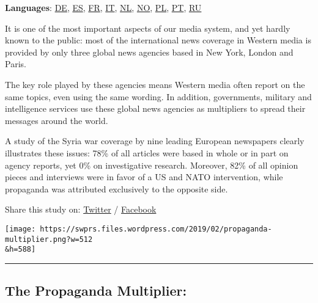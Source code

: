 \textbf{Languages}:
\href{https://swprs.org/der-propaganda-multiplikator/}{DE},
\href{https://www.bibliotecapleyades.net/sociopolitica2/sociopol_mediacontrol225.htm}{ES},
\href{https://swprs.org/le-multiplicateur-de-propagande/}{FR},
\href{https://www.bibliotecapleyades.net/sociopolitica2/sociopol_mediacontrol228.htm}{IT},
\href{https://swprs.files.wordpress.com/2019/12/propaganda-multiplier-dutch.pdf}{NL},
\href{https://midtifleisen.wordpress.com/2018/01/04/en-titt-pa-nyhetsbyraenes-rolle/}{NO},
\href{https://wolnemedia.net/powielacze-propagandy/}{PL},
\href{https://revistaopera.com.br/2019/04/23/a-propagacao-hegemonica-como-as-agencias-globais-e-a-midia-ocidental-cobrem-a-geopolitica-parte-1/}{PT},
\href{https://csa.pnzgu.ru/infopswars/ipw1}{RU}

It is one of the most important aspects of our media system, and yet
hardly known to the public: most of the international news coverage in
Western media is provided by only three global news agencies based in
New York, London and Paris.

The key role played by these agencies means Western media often report
on the same topics, even using the same wording. In addition,
governments, military and intelligence services use these global news
agencies as multipliers to spread their messages around the world.

A study of the Syria war coverage by nine leading European newspapers
clearly illustrates these issues: 78\% of all articles were based in
whole or in part on agency reports, yet 0\% on investigative research.
Moreover, 82\% of all opinion pieces and interviews were in favor of a
US and NATO intervention, while propaganda was attributed exclusively to
the opposite side.

Share this study on:
\href{https://twitter.com/intent/tweet?url=https://swprs.org/the-propaganda-multiplier/}{Twitter}
/
\href{https://www.facebook.com/share.php?u=https://swprs.org/the-propaganda-multiplier/}{Facebook}

\texttt{[image: https://swprs.files.wordpress.com/2019/02/propaganda-multiplier.png?w=512\\\&h=588]}

\begin{center}\rule{0.5\linewidth}{\linethickness}\end{center}

\hypertarget{the-propaganda-multiplier-1}{%
\subsection{The Propaganda
Multiplier:}\label{the-propaganda-multiplier-1}}

